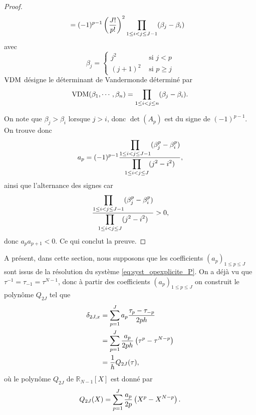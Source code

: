 \begin{proof}
\begin{align*}
	& = (-1)^{p-1} \left( \dfrac{J!}{p!} \right)^2 \displaystyle\prod\limits_{1 \leq i <j \leq J-1}(\beta_j - \beta_i)
\end{align*}
avec
\begin{equation}
\beta_j = \left\lbrace
\begin{array}{cl}
j^2 & \text{ si } j < p \\
(j+1)^2 & \text{ si } p \geq j
\end{array}
\right.
\end{equation}
$\text{VDM}$ désigne le déterminant de Vandermonde \cite{Evans1976} déterminé par 
\begin{equation}
\text{VDM}(\beta_1, \cdots, \beta_n) = \displaystyle\prod\limits_{1\leq i < j \leq n} (\beta_j - \beta_i).
\end{equation}

On note que $\beta_j > \beta_i$ lorsque $j>i$, donc $\det (A_p)$ est du signe de $(-1)^{p-1}$.
On trouve donc 
\begin{equation}
a_p = (-1)^{p-1} \dfrac{\displaystyle\prod\limits_{1 \leq i <j \leq J-1}(\beta_j^p - \beta_i^p)}{\displaystyle\prod\limits_{1 \leq i <j \leq J}(j^2 - i^2)},
\end{equation}
ainsi que l'alternance des signes car
\begin{equation}
\dfrac{\displaystyle\prod\limits_{1 \leq i <j \leq J-1}(\beta_j^p - \beta_i^p)}{\displaystyle\prod\limits_{1 \leq i <j \leq J}(j^2 - i^2)} > 0,
\end{equation}
donc $a_p a_{p+1} < 0$. Ce qui conclut la preuve.
\end{proof}
A présent, dans cette section, nous supposons que les coefficients $(a_p)_{1 \leq p \leq J}$ sont issus de la résolution du système \eqref{eq:syst_opexplicite_P}. On a déjà vu que $\tau^{-1} = \tau_{-1} = \tau^{N-1}$, donc à partir des coefficients $(a_p)_{1 \leq p \leq J}$ on construit le polynôme $Q_{2J}$ tel que
\begin{align*}
\delta_{2J,x} & = \displaystyle\sum\limits_{p=1}^J a_p \dfrac{\tau_p - \tau_{-p}}{2ph}\\
	& = \displaystyle\sum\limits_{p=1}^J \dfrac{a_p}{2ph} \left( \tau^p - \tau^{N-p} \right)\\
	& = \dfrac{1}{h} Q_{2J}(\tau),
\end{align*}
où le polynôme $Q_{2J}$ de $\mathbb{R}_{N-1}[X]$ est donné par
\begin{equation}
Q_{2J}(X) = \displaystyle\sum\limits_{p=1}^J \dfrac{a_p}{2p} \left( X^p - X^{N-p} \right).
\end{equation}

